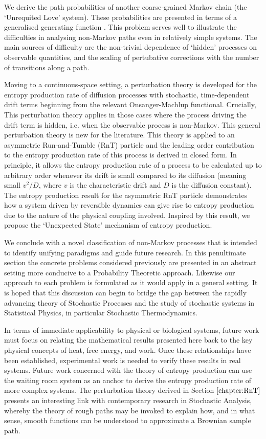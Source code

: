 We derive the path probabilities of another coarse-grained Markov chain (the `Unrequited Love' system). These probabilities are presented in terms of a generalised generating function . This problem serves well to illustrate the difficulties in analysing non-Markov paths even in relatively simple systems. The main sources of difficulty are the non-trivial dependence of `hidden' processes on observable quantities, and the scaling of pertubative corrections with the number of transitions along a path. 

Moving to a continuous-space setting, a perturbation theory is developed for the entropy production rate of diffusion processes with stochastic, time-dependent drift terms beginning from the relevant Onsanger-Machlup functional. Crucially, This perturbation theory applies in those cases where the process driving the drift term is hidden, i.e. when the observable process is non-Markov. This general perturbation theory is new for the literature. This theory is applied to an asymmetric Run-and-Tumble (RnT) particle and the leading order contribution to the entropy production rate of this process is derived in closed form. In principle, it allows the entropy production rate of a process to be calculated up to arbitrary order whenever its drift is small compared to its diffusion (meaning small $v^2/D$, where $v$ is the characteristic drift and $D$ is the diffusion constant). The entropy production result for the asymmetric RnT particle demonstrates how a system driven by reversible dynamics can give rise to entropy production due to the nature of the physical coupling involved. Inspired by this result, we propose the `Unexpected State' mechanism of entropy production. 

We conclude with a novel classification of non-Markov processes that is intended to identify unifying paradigms and guide future research. In this penultimate section the concrete problems considered previously are presented in an abstract setting more conducive to a Probability Theoretic approach. Likewise our approach to each problem is formulated as it would apply in a general setting. It is hoped that this discussion can begin to bridge the gap between the rapidly advancing theory of Stochastic Processes and the study of stochastic systems in Statistical Physics, in particular Stochastic Thermodynamics. 

In terms of immediate applicability to physical or biological systems, future work must focus on relating the mathematical results presented here back to the key physical concepts of heat, free energy, and work. Once these relationships have been established, experimental work is needed to verify these results in real systems. Future work concerned with the theory of entropy production can use the waiting room system as an anchor to derive the entropy production rate of more complex systems. The perturbation theory derived in Section $\ref{chapter:RnT}$ presents an interesting link with contemporary research in Stochastic Analysis, whereby the theory of rough paths may be invoked to explain how, and in what sense, smooth functions can be understood to approximate a Brownian sample path. 